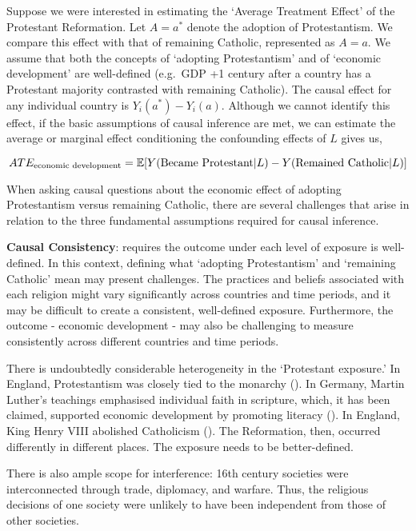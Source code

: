 \documentclass[
  single column]{article}
\begin{document}
Suppose we were interested in estimating the `Average Treatment Effect'
of the Protestant Reformation. Let \(A = a^*\) denote the adoption of
Protestantism. We compare this effect with that of remaining Catholic,
represented as \(A = a\). We assume that both the concepts of `adopting
Protestantism' and of `economic development' are well-defined (e.g.~GDP
+1 century after a country has a Protestant majority contrasted with
remaining Catholic). The causal effect for any individual country is
\(Y_i(a^*) - Y_i(a)\). Although we cannot identify this effect, if the
basic assumptions of causal inference are met, we can estimate the
average or marginal effect conditioning the confounding effects of \(L\)
gives us,

\[ATE_{\textnormal{economic~development}} = \mathbb{E}[Y(\textnormal{Became~Protestant}|L) - Y(\textnormal{Remained~Catholic}|L)]\]

When asking causal questions about the economic effect of adopting
Protestantism versus remaining Catholic, there are several challenges
that arise in relation to the three fundamental assumptions required for
causal inference.

\textbf{Causal Consistency}: requires the outcome under each level of
exposure is well-defined. In this context, defining what `adopting
Protestantism' and `remaining Catholic' mean may present challenges. The
practices and beliefs associated with each religion might vary
significantly across countries and time periods, and it may be difficult
to create a consistent, well-defined exposure. Furthermore, the outcome
- economic development - may also be challenging to measure consistently
across different countries and time periods.

There is undoubtedly considerable heterogeneity in the `Protestant
exposure.' In England, Protestantism was closely tied to the monarchy
(). In Germany, Martin
Luther's teachings emphasised individual faith in scripture, which, it
has been claimed, supported economic development by promoting literacy
(). In England,
King Henry VIII abolished Catholicism
(). The Reformation, then,
occurred differently in different places. The exposure needs to be
better-defined.

There is also ample scope for interference: 16th century societies were
interconnected through trade, diplomacy, and warfare. Thus, the
religious decisions of one society were unlikely to have been
independent from those of other societies.
\end{document}

